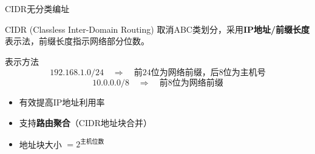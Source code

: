 \documentclass[10pt, aspectratio=169]{beamer}
\begin{document}
\begin{frame}{CIDR无分类编址}
    \begin{block}{CIDR (Classless Inter-Domain Routing)}
        取消ABC类划分，采用\textbf{IP地址/前缀长度}表示法，前缀长度指示网络部分位数。
    \end{block}
    \vspace{0.3em}
    \begin{exampleblock}{表示方法}
        \[
        192.168.1.0/24 \quad \Rightarrow \quad \text{前24位为网络前缀，后8位为主机号}
        \]
        \[
        10.0.0.0/8 \quad \Rightarrow \quad \text{前8位为网络前缀}
        \]
    \end{exampleblock}
    \vspace{0.3em}
    \begin{itemize}
        \item 有效提高IP地址利用率
        \item 支持\textbf{路由聚合}（CIDR地址块合并）
        \item 地址块大小 $= 2^{\text{主机位数}}$
    \end{itemize}
    \vspace{0.3em}
    \begin{center}
    \end{center}
\end{frame}
\end{document}
